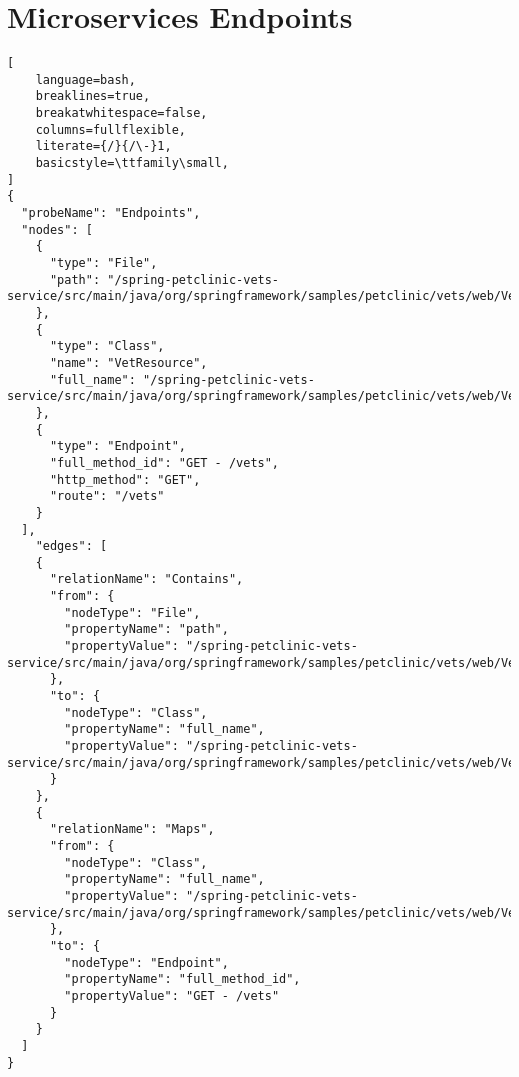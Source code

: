 \section{Microservices Endpoints}\label{appendix_sec:microservices_endpoints}
\begin{lstlisting}[
    language=bash,
    breaklines=true,
    breakatwhitespace=false,
    columns=fullflexible,
    literate={/}{/\-}1,
    basicstyle=\ttfamily\small,
]
{
  "probeName": "Endpoints",
  "nodes": [
    {
      "type": "File",
      "path": "/spring-petclinic-vets-service/src/main/java/org/springframework/samples/petclinic/vets/web/VetResource.java"
    },
    {
      "type": "Class",
      "name": "VetResource",
      "full_name": "/spring-petclinic-vets-service/src/main/java/org/springframework/samples/petclinic/vets/web/VetResource.java:VetResource"
    },
    {
      "type": "Endpoint",
      "full_method_id": "GET - /vets",
      "http_method": "GET",
      "route": "/vets"
    }
  ],
    "edges": [
    {
      "relationName": "Contains",
      "from": {
        "nodeType": "File",
        "propertyName": "path",
        "propertyValue": "/spring-petclinic-vets-service/src/main/java/org/springframework/samples/petclinic/vets/web/VetResource.java"
      },
      "to": {
        "nodeType": "Class",
        "propertyName": "full_name",
        "propertyValue": "/spring-petclinic-vets-service/src/main/java/org/springframework/samples/petclinic/vets/web/VetResource.java:VetResource"
      }
    },
    {
      "relationName": "Maps",
      "from": {
        "nodeType": "Class",
        "propertyName": "full_name",
        "propertyValue": "/spring-petclinic-vets-service/src/main/java/org/springframework/samples/petclinic/vets/web/VetResource.java:VetResource"
      },
      "to": {
        "nodeType": "Endpoint",
        "propertyName": "full_method_id",
        "propertyValue": "GET - /vets"
      }
    }
  ]
}
\end{lstlisting}

